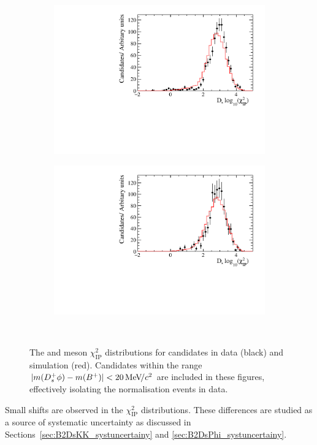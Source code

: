 \begin{figure}[!h]
\begin{subfigure}[t]{0.32\textwidth}
      \includegraphics[width=1.0\textwidth]{figs/Selection/Data_MC_Comparison_Var_2_B2DsD0_Ds2PiPiPi.pdf}
      \caption{\decay{\Dsp}{\pip\pim\pip}}
   \end{subfigure}
   \begin{subfigure}[t]{0.32\textwidth}
      \centering
      \includegraphics[width=1.0\textwidth]{figs/Selection/Data_MC_Comparison_Var_2_B2DsD0_Ds2KPiPi.pdf}
      \caption{\decay{\Dsp}{\Kp\pim\pip}}
   \end{subfigure}\\
   \caption{The \Bp and \Dsp meson $\chi^{2}_{\text{IP}}$ distributions for \decay{\Bp}{\Dsp\Dzb} candidates in data (black) and simulation (red). Candidates within the range $|m({{D}^+_{s}}\phi) - m({{{B}^+}})| < 20 {\mathrm{\,Me\kern -0.1em V\!/}c^2}$ are included in these figures, effectively isolating the normalisation events in data.}
   \label{fig:ipchi2dist_normalisation}   
\end{figure}



Small shifts are observed in the $\chi^{2}_{\text{IP}}$ distributions. These differences are studied as a source of systematic uncertainty as discussed in Sections~\ref{sec:B2DsKK_systuncertainy} and \ref{sec:B2DsPhi_systuncertainy}.


